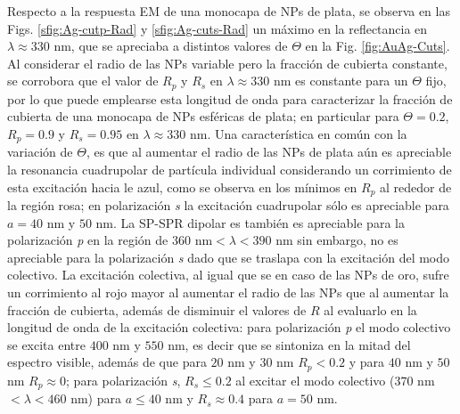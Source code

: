Respecto a la respuesta EM de una monocapa de NPs de plata, se observa en las Figs. \ref{sfig:Ag-cutp-Rad} y \ref{sfig:Ag-cuts-Rad} un máximo en la reflectancia en $\lambda \approx 330$ nm, que se apreciaba a distintos valores de $\Theta$ en la Fig. \ref{fig:AuAg-Cuts}. Al considerar el radio de las NPs variable pero la fracción de cubierta constante, se corrobora que el valor de $R_p$ y $R_s$ en $\lambda\approx 330$ nm es constante para un $\Theta$ fijo, por lo que puede emplearse esta longitud de onda para caracterizar la fracción de cubierta de una monocapa de NPs esféricas de plata; en particular para $\Theta=0.2$, $R_p = 0.9$ y $R_s = 0.95$ en $\lambda \approx 330$ nm. Una característica en común con la variación de $\Theta$, es que al aumentar el radio de las NPs de plata aún es apreciable la resonancia cuadrupolar de partícula individual considerando un corrimiento de esta excitación hacia le azul, como se observa en los mínimos en $R_p$ al rededor de la región rosa; en polarización \emph{s} la excitación cuadrupolar sólo es apreciable para $a=40$ nm y $50$ nm. La SP-SPR dipolar es también es apreciable para la polarización \emph{p} en la región de $360$ nm$<\lambda<390$ nm sin embargo, no es apreciable para la polarización \emph{s} dado que se traslapa con la excitación del modo colectivo. La excitación colectiva, al igual que se en caso de las NPs de oro, sufre un corrimiento al rojo mayor al aumentar el radio de las NPs que al aumentar la fracción de cubierta, además de disminuir el valores de $R$ al evaluarlo en la longitud de onda de la excitación colectiva: para polarización \emph{p} el modo colectivo se excita entre $400$ nm y $550$ nm, es decir que se sintoniza en la mitad del espectro visible, además de que para $20$ nm y $30$ nm $R_p<0.2$ y para $40$ nm y $50$ nm $R_p \approx 0$; para polarización \emph{s}, $R_s\leq 0.2$ al excitar el modo colectivo ($370$ nm$<\lambda<460$ nm) para $a\leq 40$ nm y $R_s\approx 0.4$ para $a=50$ nm.


